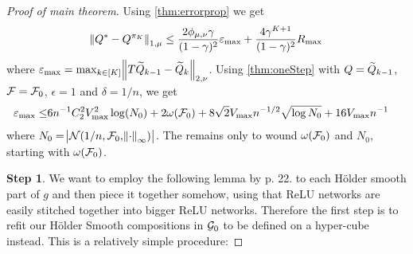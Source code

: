




\begin{proof}[Proof of main theorem] %
  Using \cref{thm:errorprop} we get
  \begin{equation}
    \norm{Q^* - Q^{\pi_K}}_{1,\mu} \leq
    \frac{2 \phi_{\mu, \nu} \gamma}{(1-\gamma)^2}\varepsilon_{\max} +
    \frac{4 \gamma^{K+1}}{(1-\gamma)^2} R_{\max}
    \label{eq:mp1}
  \end{equation}
  where $\varepsilon_{\max} =
  \max_{k \in [K]} \norm{T \widetilde{Q}_{k-1} - \widetilde{Q}_k}_{2, \nu}$.
  Using \cref{thm:oneStep} with $Q = \widetilde{Q}_{k-1}$,
  $\mathcal{F} = \mathcal{F}_0$, $\epsilon = 1$ and $\delta = 1/n$, we get
  \begin{align}
    \varepsilon_{\max} \leq & 6 n^{-1} C_2^2 V_{\max}^2 \log(N_0)
    + 2 \omega(\mathcal{F}_0)
    + 8 \sqrt{2} V_{\max} n^{-1/2} \sqrt{\log N_0}
    + 16 V_{\max} n^{-1}
    \label{eq:mp2}
  \end{align}
  where $N_0 = \abs{\mathcal{N}(1/n, \mathcal{F}_0, \norm{\cdot}_\infty)}$.
  The remains only to wound $\omega(\mathcal{F}_0)$ and $N_0$,
  starting with $\omega(\mathcal{F}_0)$.

  \textbf{Step 1}. %
  We want to employ the following lemma by  p. 22.
  to each Hölder smooth part of $g$ and then piece it together somehow,
  using that ReLU networks are easily stitched together into bigger
  ReLU networks.
  Therefore the first step is to refit our
  Hölder Smooth compositions in $\mathcal{G}_0$ to be defined on a hyper-cube instead.
  This is a relatively simple procedure:


\end{proof}
